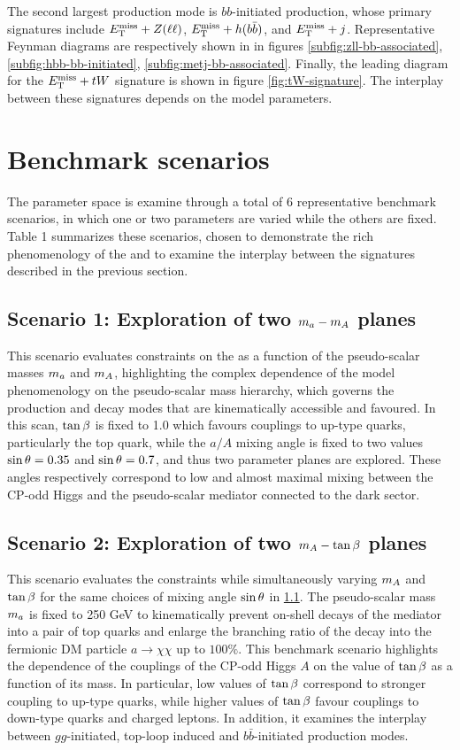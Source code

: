 The second largest production mode is $bb$-initiated production, whose primary signatures include $E_{\mathrm{T}}^{\mathrm{miss}}+Z(\ell\ell)$, $E_{\mathrm{T}}^{\mathrm{miss}}+h(b\bar{b})$, and $E_{\mathrm{T}}^{\mathrm{miss}}+j$. 
Representative Feynman diagrams are respectively shown in in figures \ref{subfig:zll-bb-associated}, \ref{subfig:hbb-bb-initiated}, \ref{subfig:metj-bb-associated}. 
Finally, the leading diagram for the $E_{\mathrm{T}}^{\mathrm{miss}}+tW$ signature is shown in figure \ref{fig:tW-signature}. 
The interplay between these signatures depends on the \thdma model parameters. 

\section{Benchmark scenarios}
\label{sect:benchmark-scenarios}
The parameter space is examine through a total of 6 representative benchmark scenarios, in which one or two parameters are varied while the others are fixed. 
Table 1 summarizes these scenarios, chosen to demonstrate the rich phenomenology of the \thdma and to examine the interplay between the signatures described in the previous section.

\subsection{Scenario 1: Exploration of two \texorpdfstring{$m_a-m_A$}{TEXT} planes}\label{subsection:ma-mA-scan}
This scenario evaluates constraints on the \thdma as a function of the pseudo-scalar masses $m_a$ and $m_A$, 
highlighting the complex dependence of the model phenomenology on the pseudo-scalar mass hierarchy, 
which governs the production and decay modes that are kinematically accessible and favoured. 
In this scan, $\tan\beta$ is fixed to 1.0 which favours couplings to up-type quarks, particularly the top quark, 
while the $a/A$ mixing angle is fixed to two values $\sin\theta=0.35$ and $\sin\theta=0.7$, and thus two parameter planes are explored. 
These angles respectively correspond to low and almost maximal mixing between the CP-odd Higgs and the pseudo-scalar mediator connected to the dark sector.

\subsection{Scenario 2: Exploration of two \texorpdfstring{$m_A-\tan\beta$}{TEXT} planes}\label{subsection:mA-tanb-scan}

This scenario evaluates the constraints while simultaneously varying $m_A$ and $\tan\beta$ for the same choices of mixing angle $\sin\theta$ in \ref{subsection:ma-mA-scan}. 
The pseudo-scalar mass $m_a$ is fixed to 250 GeV to kinematically prevent on-shell decays of the mediator into a pair 
of top quarks and enlarge the branching ratio of the decay into the fermionic DM particle $a\rightarrow \chi\chi$ up to $100\%$. 
This benchmark scenario highlights the dependence of the couplings of the CP-odd Higgs $A$ on the value of $\tan\beta$ as a function of its mass. 
In particular, low values of $\tan\beta$ correspond to stronger coupling to up-type quarks, 
while higher values of $\tan\beta$ favour couplings to down-type quarks and charged leptons. 
In addition, it examines the interplay between $gg$-initiated, top-loop induced and $b\bar{b}$-initiated production modes. 


